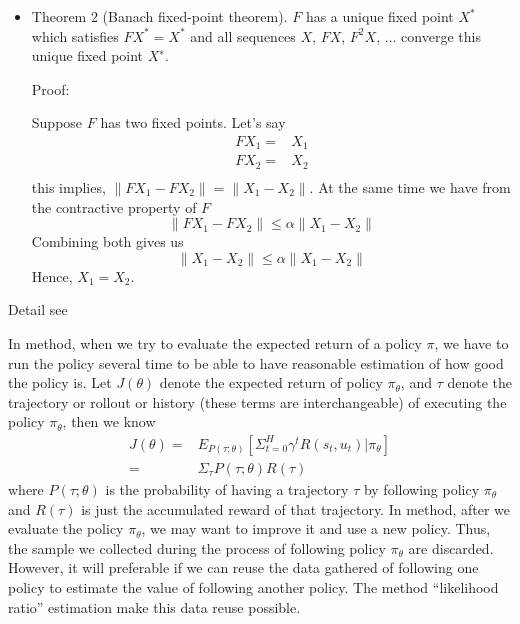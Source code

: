 \documentclass[9pt]{article}
\begin{document}
\begin{itemize}
\item Theorem 2 (Banach fixed-point theorem). $F$ has a unique fixed point $X^*$ which satisfies $FX^* = X^*$ and all
sequences $X$, $FX$, $F^2X$, $\ldots$ converge this unique fixed point $X^∗$.

Proof:

Suppose $F$ has two fixed points. Let's say
\begin{displaymath}
  \begin{split}
  FX_1 = & X_1\\
  FX_2 = & X_2\\
  \end{split}
\end{displaymath}
this implies, $\| FX_1 - FX_2\| = \| X_1-X_2 \|$. At the same time we have from the contractive property of $F$ 
\begin{displaymath}
  \|FX_1-FX_2\| \le \alpha \|X_1-X_2\|
\end{displaymath}
Combining both gives us 
\[
\|X_1-X_2\| \le \alpha\|X_1-X_2\|
\]
Hence, $X_1=X_2$.
\end{itemize}

Detail see \citep{conrad2014contraction}


 In  method, when we try to evaluate the expected return of a policy $\pi$, we have to run the policy several time to be able to have reasonable estimation of how good the policy is. Let $J(\theta)$ denote the expected return of policy $\pi_{\theta}$, and $\tau$ denote the trajectory or rollout or history (these terms are interchangeable) of executing the policy $\pi_{\theta}$, then we know
\[
\begin{split}
J(\theta) = & E_{P(\tau;\theta)}[\Sigma_{t=0}^{H}\gamma^tR(s_t,u_t)|\pi_{\theta}]\\
= & \Sigma_{\tau}P(\tau;\theta)R(\tau)
\end{split}
\]
where $P(\tau;\theta)$ is the probability of having a trajectory $\tau$ by following policy $\pi_{\theta}$ and $R(\tau)$ is just the accumulated reward of that trajectory. 
In  method, after we evaluate the policy $\pi_{\theta}$, we may want to improve it and use a new policy. Thus, the sample we collected during the process of following policy $\pi_{\theta}$ are discarded. However, it will preferable if we can reuse the data gathered of following one policy to estimate the value of following another policy. The method ``likelihood ratio'' estimation make this data reuse possible.
\end{document}
